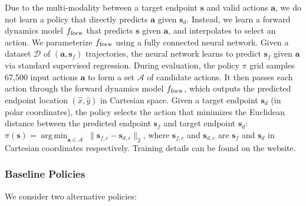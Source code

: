 \documentclass[letterpaper, 10pt, conference]{ieeeconf}  %
\newcommand{\ba}{\mathbf{a}}
\newcommand{\bs}{\mathbf{s}}
\newcommand{\state}{\mathbf{s}}
\DeclareMathOperator*{\argmin}{arg\,min}
\newcommand{\remark}[3]{{\color{#2}[#1: #3]}}
\newcommand{\Vincent}[1]{\remark{Vincent}{purple}{#1}}
\begin{document}
Due to the multi-modality between a target endpoint $\bs$ and valid actions $\ba$, we do not learn a policy that directly predicts $\ba$ given $\bs_d$. Instead, we learn a forward dynamics model $f_{\rm forw}$ that predicts $\bs$ given $\ba$, and interpolates to select an action. We parameterize $f_{\rm forw}$ using a fully connected neural network. 
Given a dataset $\mathcal{D}$ of $(\ba, \bs_f)$ trajectories, the neural network learns to predict $\bs_f$ given $\ba$ via standard supervised regression. During evaluation, the policy $\pi$ grid samples 67,500 input actions $\ba$ to form a set $\mathcal{A}$ of candidate actions. It then passes each action through the forward dynamics model $f_{\rm forw}$, which outputs the predicted endpoint location $(\hat{x}, \hat{y})$ in Cartesian space. Given a target endpoint $\bs_d$ (in polar coordinates), the policy selects the action that minimizes the Euclidean distance between the predicted endpoint $\bs_f$ and target endpoint $\bs_d$: $\pi(\bs) = \argmin_{\ba \in \mathcal{A}} \; \| \bs_{f, c} - \bs_{d, c} \|_2$, %
where $\state_{f, c}$ and $\state_{d, c}$ are $\state_f$ and $\state_d$ in Cartesian coordinates respectively. Training details can be found on the website. %

\subsubsection{Baseline Policies}\label{sssec:baseline}

We consider two alternative policies:
\end{document}
